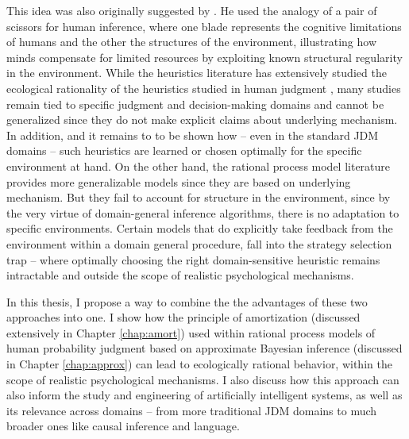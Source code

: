 This idea was also originally suggested by \citet{simon1955behavioral}. He used the analogy of a pair of scissors for human inference, where one blade represents the cognitive limitations of humans and the other the structures of the environment, illustrating how minds compensate for limited resources by exploiting known structural regularity in the environment. While the heuristics literature has extensively studied the ecological rationality of the heuristics studied in human judgment \citep{gigerenzer2008heuristics}, many studies remain tied to specific judgment and decision-making domains and cannot be generalized since they do not make explicit claims about underlying mechanism. In addition, and it remains to to be shown how -- even in the standard JDM domains -- such heuristics are learned or chosen optimally for the specific environment at hand. On the other hand, the rational process model literature provides more generalizable models since they are based on underlying mechanism. But they fail to account for structure in the environment, since by the very virtue of domain-general inference algorithms, there is no adaptation to specific environments. Certain models that do explicitly take feedback from the environment within a domain general procedure, fall into the strategy selection trap -- where optimally choosing the right domain-sensitive heuristic remains intractable and outside the scope of realistic psychological mechanisms.

In this thesis, I propose a way to combine the the advantages of these two approaches into one. I show how the principle of amortization (discussed extensively in Chapter \ref{chap:amort}) used within rational process models of human probability judgment based on approximate Bayesian inference (discussed in Chapter \ref{chap:approx}) can lead to ecologically rational behavior, within the scope of realistic psychological mechanisms. I also discuss how this approach can also inform the study and engineering of artificially intelligent systems, as well as its relevance across domains -- from more traditional JDM domains to much broader ones like causal inference and language.

